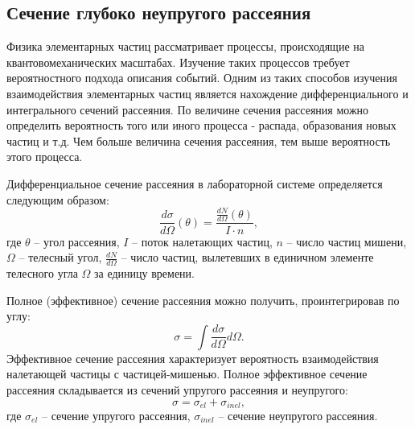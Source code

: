 \documentclass{extarticle}
\begin{document}
\subsection{Сечение глубоко неупругого рассеяния}

Физика элементарных частиц рассматривает процессы, происходящие на квантовомеханических масштабах. Изучение таких процессов требует вероятностного подхода описания событий. Одним из таких способов изучения взаимодействия элементарных частиц является нахождение дифференциального и интегрального сечений рассеяния. По величине сечения рассеяния можно определить вероятность того или иного процесса - распада, образования новых частиц и т.д. Чем больше величина сечения рассеяния, тем выше вероятность этого процесса.

Дифференциальное сечение рассеяния в лабораторной системе определяется следующим образом:
\begin{equation}
    \frac{d\sigma}{d\Omega}(\theta) = \frac{\frac{dN}{d\Omega}(\theta)}{I \cdot n},
\end{equation}
где $\theta$ -- угол рассеяния, $I$ -- поток налетающих частиц, $n$ -- число частиц мишени, $\Omega$ -- телесный угол, $\frac{dN}{d\Omega}$ -- число частиц, вылетевших в единичном элементе телесного угла $\Omega$ за единицу времени.

Полное (эффективное) сечение рассеяния можно получить, проинтегрировав по углу:
\begin{equation}
    \sigma = \int \frac{d\sigma}{d\Omega}d\Omega. 
\end{equation}
Эффективное сечение рассеяния характеризует вероятность взаимодействия налетающей частицы с частицей-мишенью. Полное эффективное сечение рассеяния складывается из сечений упругого рассеяния и неупругого:
\begin{equation}
    \sigma = \sigma_{el} + \sigma_{inel},
\end{equation}
где $\sigma_{el}$ -- сечение упругого рассеяния, $\sigma_{inel}$ -- сечение неупругого рассеяния. 
\end{document}
